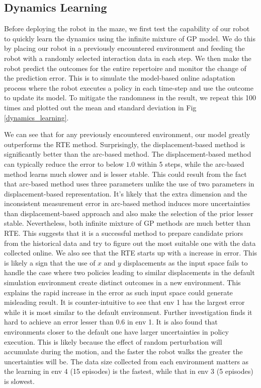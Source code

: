 \subsection{Dynamics Learning}
Before deploying the robot in the maze, we first test the capability of our robot to quickly learn the dynamics using the infinite mixture of GP model.
We do this by placing our robot in a previously encountered environment and feeding the robot with a randomly selected interaction data in each step.
We then make the robot predict the outcomes for the entire repertoire and monitor the change of the prediction error.
This is to simulate the model-based online adaptation process where the robot executes a policy in each time-step and use the outcome to update its model.
To mitigate the randomness in the result, we repeat this 100 times and plotted out the mean and standard deviation in Fig \ref{dynamics_learning}.


We can see that for any previously encountered environment, our model greatly outperforms the RTE method.
Surprisingly, the displacement-based method is significantly better than the arc-based method.
The displacement-based method can typically reduce the error to below $1.0$ within 5 steps, while the arc-based method learns much slower and is lesser stable.
This could result from the fact that arc-based method uses three parameters unlike the use of two parameters in displacement-based representation.
It's likely that the extra dimension and the inconsistent measurement error in arc-based method induces more uncertainties than displacement-based approach and also make the selection of the prior lesser stable.
Nevertheless, both infinite mixture of GP methods are much better than RTE.
This suggests that it is a successful method to prepare candidate priors from the historical data and try to figure out the most suitable one with the data collected online.
We also see that the RTE starts up with a increase in error.
This is likely a sign that the use of $x$ and $y$ displacements as the input space fails to handle the case where two policies leading to similar displacements in the default simulation environment create distinct outcomes in a new environment.
This explains the rapid increase in the error as such input space could generate misleading result.
It is counter-intuitive to see that env 1 has the largest error while it is most similar to the default environment.
Further investigation finds it hard to achieve an error lesser than 0.6 in env 1.
It is also found that environments closer to the default one have larger uncertainties in policy execution.
This is likely because the effect of random perturbation will accumulate during the motion, and the faster the robot walks the greater the uncertainties will be.
The data size collected from each environment matters as the learning in env 4 (15 episodes) is the fastest, while that in env 3 (5 episodes) is slowest.

